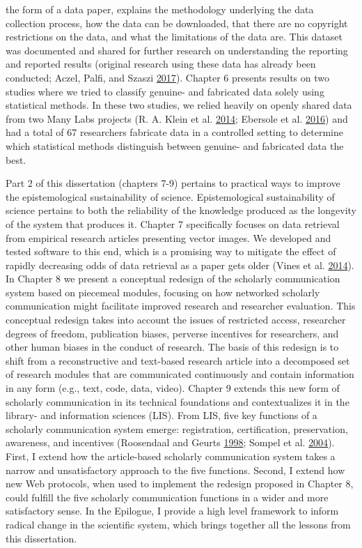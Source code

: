 \documentclass[a5paper]{book}
\begin{document}
the form of a data paper, explains the methodology underlying the data
collection process, how the data can be downloaded, that there are no
copyright restrictions on the data, and what the limitations of the data
are. This dataset was documented and shared for further research on
understanding the reporting and reported results (original research
using these data has already been conducted; Aczel, Palfi, and Szaszi
\protect\hyperlink{ref-doi:10.1371ux2fjournal.pone.0182651}{2017}).
Chapter 6 presents results on two studies where we tried to classify
genuine- and fabricated data solely using statistical methods. In these
two studies, we relied heavily on openly shared data from two Many Labs
projects (R. A. Klein et al.
\protect\hyperlink{ref-doi:10.1027ux2f1864-9335ux2fa000178}{2014};
Ebersole et al.
\protect\hyperlink{ref-doi:10.1016ux2fj.jesp.2015.10.012}{2016}) and had
a total of 67 researchers fabricate data in a controlled setting to
determine which statistical methods distinguish between genuine- and
fabricated data the best.

Part 2 of this dissertation (chapters 7-9) pertains to practical ways to
improve the epistemological sustainability of science. Epistemological
sustainability of science pertains to both the reliability of the
knowledge produced as the longevity of the system that produces it.
Chapter 7 specifically focuses on data retrieval from empirical research
articles presenting vector images. We developed and tested software to
this end, which is a promising way to mitigate the effect of rapidly
decreasing odds of data retrieval as a paper gets older (Vines et al.
\protect\hyperlink{ref-doi:10.1016ux2fj.cub.2013.11.014}{2014}). In
Chapter 8 we present a conceptual redesign of the scholarly
communication system based on piecemeal modules, focusing on how
networked scholarly communication might facilitate improved research and
researcher evaluation. This conceptual redesign takes into account the
issues of restricted access, researcher degrees of freedom, publication
biases, perverse incentives for researchers, and other human biases in
the conduct of research. The basis of this redesign is to shift from a
reconstructive and text-based research article into a decomposed set of
research modules that are communicated continuously and contain
information in any form (e.g., text, code, data, video). Chapter 9
extends this new form of scholarly communication in its technical
foundations and contextualizes it in the library- and information
sciences (LIS). From LIS, five key functions of a scholarly
communication system emerge: registration, certification, preservation,
awareness, and incentives (Roosendaal and Geurts
\protect\hyperlink{ref-roosendaal1998}{1998}; Sompel et al.
\protect\hyperlink{ref-doi:10.1045ux2fseptember2004-vandesompel}{2004}).
First, I extend how the article-based scholarly communication system
takes a narrow and unsatisfactory approach to the five functions.
Second, I extend how new Web protocols, when used to implement the
redesign proposed in Chapter 8, could fulfill the five scholarly
communication functions in a wider and more satisfactory sense. In the
Epilogue, I provide a high level framework to inform radical change in
the scientific system, which brings together all the lessons from this
dissertation.
\end{document}
